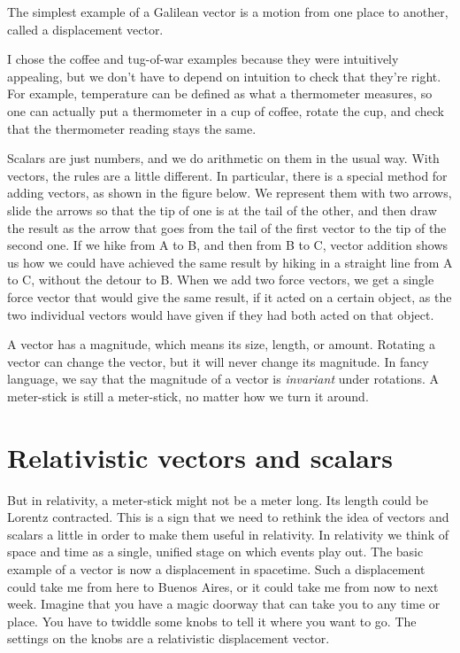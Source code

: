 
The simplest example of a Galilean vector is a motion from one place to another,
called a displacement vector.

I chose the coffee and tug-of-war examples because they were intuitively appealing,
but we don't have to depend on intuition to check that they're right. For example,
temperature can be defined as what a thermometer measures, so one can actually
put a thermometer in a cup of coffee, rotate the cup, and check that the thermometer reading
stays the same.

Scalars are just numbers, and we do arithmetic on them in the usual way.
With vectors, the rules are a little different. In particular, there is
a special method for adding vectors, as shown in the figure below. We represent
them with two arrows, slide the arrows so that the tip of one is at the tail
of the other, and then draw the result as the arrow that goes from the tail
of the first vector to the tip of the second one. If we hike from A to B, and then
from B to C, vector addition shows us how we could have achieved the same result
by hiking in a straight line from A to C, without the detour to B. When we add
two force vectors, we get a single force vector that would give the same result,
if it acted on a certain object, as the two individual vectors would have given
if they had both acted on that object.


A vector has a magnitude, which means its size, length, or amount. Rotating a vector
can change the vector, but it will never change its magnitude.
In fancy language, we say that the magnitude of a vector is \emph{invariant} under rotations.
A meter-stick is
still a meter-stick, no matter how we turn it around.

\section{Relativistic vectors and scalars}

But in relativity, a meter-stick might not be a meter long. Its length could be Lorentz contracted.
This is a sign that we need to rethink the idea of vectors and scalars a little in order to make
them useful in relativity. In relativity we think of space and time as a single, unified stage
on which events play out. The basic example of a vector is now a displacement in spacetime.
Such a displacement could take me from here to Buenos Aires, or it could take me from now to next week.
Imagine that you have a magic doorway that can take you to any time or place. You have to twiddle some
knobs to tell it where you want to go. The settings on the knobs are a relativistic displacement vector.

